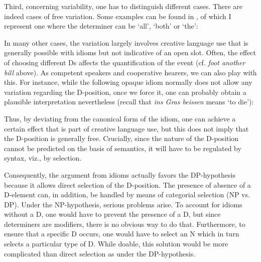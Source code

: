 \documentclass[output=paper,colorlinks,citecolor=black,
]{langscibook}
\begin{document}
\noindent
Third, concerning variability, one has to distinguish different cases. There are indeed cases of free variation. Some  examples can be found in \citet[209]{Fleischer:1982:Phraseologie}, of which I represent one where the determiner can be `all', `both' or `the':
   
   \z
   
\noindent
In many other cases, the variation largely involves creative language use that is generally possible
with idioms but not indicative of an open slot. Often, the effect of choosing different Ds affects
the quantification of the event (cf. \textit{foot another bill} above). As competent speakers and
cooperative hearers, we can also play with this. For instance, while the  following opaque idiom
normally does not allow any variation regarding the D-position, once we force it, one can probably
obtain a plausible interpretation nevertheless (recall that \textit{ins Gras beissen} 
means `to die'): 
    
    \z
    
\noindent
Thus, by deviating from the canonical form of the idiom, one can achieve a certain effect that is part of creative language use, but this does not imply that the D-position is generally free. Crucially, since the nature of the D-position cannot be predicted on the basis of semantics, it will have to be regulated by syntax, viz., by selection. 
    
    Consequently, the argument from idioms actually favors the DP-hypothesis because it allows direct selection of the D-position. The presence of absence of a D-element can, in addition, be handled by means of categorial selection (NP vs. DP). Under the NP-hypothesis, serious problems arise. To account for idioms without a D, one would have to prevent the presence of a D, but since determiners are modifiers, there is no obvious way to do that. Furthermore, to ensure that a specific D occurs, one would have to select an N which in turn selects a particular type of D. While doable, this solution would be more complicated than direct selection as under the DP-hypothesis.
\end{document}
